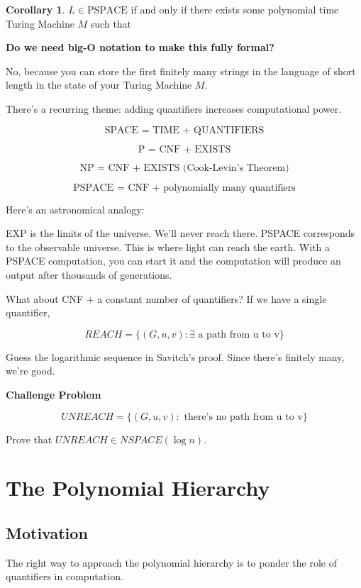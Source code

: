 \documentclass{article}
\theoremstyle{definition}
\newtheorem{corollary}{Corollary}[theorem]
\begin{document}
\begin{corollary}
    $L \in \text{PSPACE}$ if and only if there exists some polynomial time Turing Machine $M$ such that
\end{corollary}

\textbf{Do we need big-O notation to make this fully formal?}

No, because you can store the first finitely many strings in the language of short length in the state of your Turing Machine $M$.

There's a recurring theme: adding quantifiers increases computational power. 

\[ \text{SPACE = TIME + QUANTIFIERS}\]

\[ \text{P = CNF + EXISTS}\]

\[ \text{NP = CNF + EXISTS (Cook-Levin's Theorem)}\]

\[ \text{PSPACE = CNF + polynomially many quantifiers}\]

Here's an astronomical analogy:

EXP is the limits of the universe. We'll never reach there. PSPACE corresponds to the observable universe. This is where light can reach the earth. With a PSPACE computation, you can start it and the computation will produce an output after thousands of generations.

What about CNF + a constant number of quantifiers? If we have a single quantifier, 


\[ REACH = \{ (G,u,v) : \exists \text{ a path from u to v}\}\]

Guess the logarithmic sequence in Savitch's proof. Since there's finitely many, we're good.

\textbf{Challenge Problem}

\[ UNREACH = \{ (G,u,v) : \text{ there's no path from u to v}\}\]

Prove that $UNREACH \in NSPACE(\log n)$.

\newpage

\section{The Polynomial Hierarchy}

\subsection{Motivation}

The right way to approach the polynomial hierarchy is to ponder the role of quantifiers in computation. 
\end{document}
